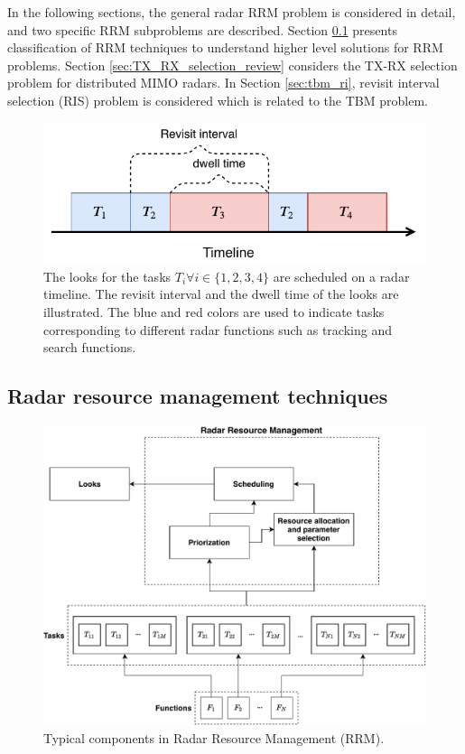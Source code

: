 \documentclass[english, 12pt, a4paper, elec, utf8, a-1b, online]{aaltothesis}
\begin{document}
In the following sections, the general radar RRM problem is considered in detail, and two specific RRM subproblems are described.
Section \ref{sec:RRM_tech} presents classification of RRM techniques to understand higher level solutions for RRM problems.
Section \ref{sec:TX_RX_selection_review} considers the TX-RX selection problem for distributed MIMO radars. 
In Section \ref{sec:tbm_ri}, revisit interval selection (RIS) problem is considered which is related to the TBM problem.


\begin{figure}[h]
    \centering
    \includegraphics{figures/timeline.pdf}
    \caption{
        The looks for the tasks $T_i \forall i\in\{1,2,3,4\}$ are scheduled on a radar timeline. 
        The revisit interval and the dwell time of the looks are illustrated.
        The blue and red colors are used to indicate tasks corresponding to different radar functions such as tracking and search functions.
    }
    \label{fig:timeline}
\end{figure}

\subsection{Radar resource management techniques} \label{sec:RRM_tech}

\begin{figure}[tb]
    \centering
    \includegraphics[width=.9\linewidth]{figures/RRM_diagram.pdf}
    \caption{Typical components in Radar Resource Management (RRM).}
    \label{fig:RRM_diagram}
\end{figure}
\end{document}
